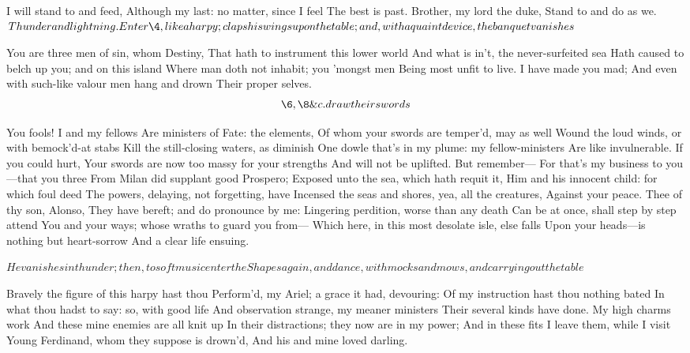 \documentclass[11pt]{book}
\begin{document}
\6	                  I will stand to and feed,
	Although my last: no matter, since I feel
	The best is past. Brother, my lord the duke,
	Stand to and do as we. \\

	\(Thunder and lightning. Enter \4, like a harpy; claps his wings upon
     the table; and, with a quaint device, the banquet vanishes\)

\4	You are three men of sin, whom Destiny,
	That hath to instrument this lower world
	And what is in't, the never-surfeited sea
	Hath caused to belch up you; and on this island
	Where man doth not inhabit; you 'mongst men
	Being most unfit to live. I have made you mad;
	And even with such-like valour men hang and drown
	Their proper selves. \\

	\[\6, \8 \&c. draw their swords\]

		You fools! I and my fellows
	Are ministers of Fate: the elements,
	Of whom your swords are temper'd, may as well
	Wound the loud winds, or with bemock'd-at stabs
	Kill the still-closing waters, as diminish
	One dowle that's in my plume: my fellow-ministers
	Are like invulnerable. If you could hurt,
	Your swords are now too massy for your strengths
	And will not be uplifted. But remember---
	For that's my business to you---that you three
	From Milan did supplant good Prospero;
	Exposed unto the sea, which hath requit it,
	Him and his innocent child: for which foul deed
	The powers, delaying, not forgetting, have
	Incensed the seas and shores, yea, all the creatures,
	Against your peace. Thee of thy son, Alonso,
	They have bereft; and do pronounce by me:
	Lingering perdition, worse than any death
	Can be at once, shall step by step attend
	You and your ways; whose wraths to guard you from---
	Which here, in this most desolate isle, else falls
	Upon your heads---is nothing but heart-sorrow
	And a clear life ensuing.

	\(He vanishes in thunder; then, to soft music
	enter the Shapes again, and dance, with
	mocks and mows, and carrying out the table\)

\1	Bravely the figure of this harpy hast thou
	Perform'd, my Ariel; a grace it had, devouring:
	Of my instruction hast thou nothing bated
	In what thou hadst to say: so, with good life
	And observation strange, my meaner ministers
	Their several kinds have done. My high charms work
	And these mine enemies are all knit up
	In their distractions; they now are in my power;
	And in these fits I leave them, while I visit
	Young Ferdinand, whom they suppose is drown'd,
	And his and mine loved darling.
\end{document}

